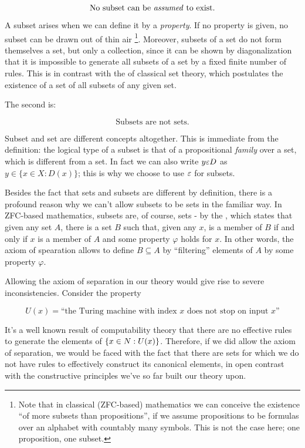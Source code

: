 \[ \text{No subset can be \emph{assumed} to exist.} \]

A subset arises when we can define it by a \emph{property}. If no property is
given, no subset can be drawn out of thin air
\footnote{Note that in classical (ZFC-based) mathematics we can conceive the
existence ``of more subsets than propositions'', if we assume propositions to be
formulas over an alphabet with countably many symbols. This is not the case
here; one proposition, one subset.}.
Moreover, subsets of a set do not form themselves a set, but only a collection,
since it can be shown by diagonalization that it is impossible to
generate all subsets of a set by a fixed finite number of rules.
This is in contrast with the  of classical set theory,
which postulates the existence of a set of all subsets of any given set.

The second is:

\[ \text{Subsets are not sets.} \]

Subset and set are different concepts altogether.
This is immediate from the definition: the logical type of a subset
is that of a propositional \emph{family} over a set, which is
different from a set.
In fact we can also write \(y \varepsilon D\) as
\(y \in \{x \in X : D(x)\}\); this is why we choose to use \(\varepsilon\)
for subsets.

Besides the fact that sets and subsets are different by definition, there is a
profound reason why we can't allow subsets to be sets in the familiar way.
In ZFC-based mathematics, subsets are, of course, sets - by the
, which states that given any set $A$,
there is a set $B$ such that, given any $x$, is a member of $B$ if and
only if $x$ is a member of $A$ and some property $\varphi$ holds for $x$.
In other words, the axiom of spearation allows to define
$B \subseteq A$ by ``filtering'' elements of $A$ by some property
$\varphi$.

Allowing the axiom of separation in our theory would give rise to
severe inconsistencies.
Consider the property

\[ U(x) = \text{``the Turing machine with index
  $x$ does not stop on input $x$''} \]

It's a well known result of computability theory that there are no effective
rules to generate the elements of $\{x \in N : U(x) \}$.  Therefore, if we
did allow the axiom of separation, we would be faced with the fact that there
are sets for which we do not have rules to effectively construct its canonical
elements, in open contrast with the constructive principles we've so far built
our theory upon.

